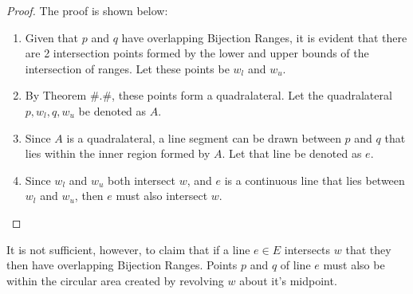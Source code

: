 \documentclass[12pt]{article}
\begin{document}
\begin{proof}
The proof is shown below:
\begin{enumerate}[(1)]
\item Given that $p$ and $q$ have overlapping Bijection Ranges,
it is evident that there are 2 intersection points formed by
the lower and upper bounds of the intersection of ranges.
Let these points be $w_l$ and $w_u$.
\item By Theorem \#.\#, these points form a quadralateral.
Let the quadralateral $p,w_l,q,w_u$ be denoted as $A$.
\item Since $A$ is a quadralateral,
a line segment can be drawn between $p$ and $q$ that lies within
the inner region formed by $A$.
Let that line be denoted as $e$.
\item Since $w_l$ and $w_u$ both intersect $w$, and $e$ is a continuous line
that lies between $w_l$ and $w_u$, then $e$ must also intersect $w$.
\end{enumerate}
\end{proof}

It is not sufficient, however, to claim that if a line $e \in E$ intersects $w$
that they then have overlapping Bijection Ranges.
Points $p$ and $q$ of line $e$ must also be within the circular area created by
revolving $w$ about it's midpoint.
\end{document}

